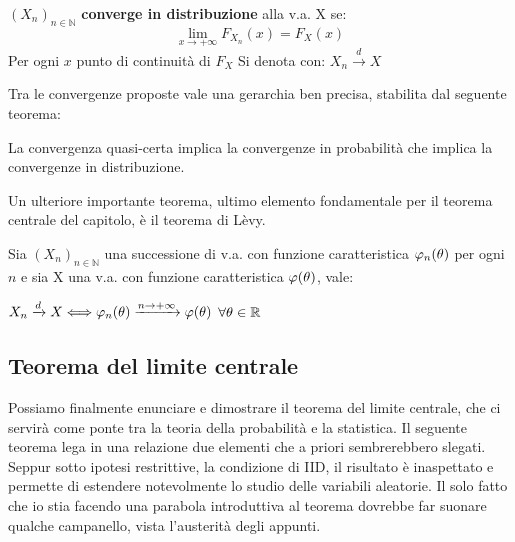 \vspace{5px}

\begin{definition}
$(X_n)_{n\in\mathbb{N}}$ \textbf{converge in distribuzione} alla v.a. X se:
\[\lim_{x \to +\infty} F_{X_n}(x) = F_X(x)\]
Per ogni $x$ punto di continuità di $F_X$ 
\newline
\noindent
Si denota con: $X_n\xrightarrow{d}X$
\end{definition}


Tra le convergenze proposte vale una gerarchia ben precisa, stabilita dal seguente teorema:

\vspace{5px}

\begin{theorem}
La convergenza quasi-certa implica la convergenze in probabilità che implica la convergenze in distribuzione.
\end{theorem}



Un ulteriore importante teorema, ultimo elemento fondamentale per il teorema centrale del capitolo, è il teorema di Lèvy.

\begin{theorem}[Lèvy]
Sia $(X_n)_{n\in\mathbb{N}}$ una successione di v.a. con funzione caratteristica $\varphi_n(\theta)$ per ogni $n$ e sia X una v.a. con funzione caratteristica $\varphi(\theta)$, vale:
\begin{center}
$X_n\xrightarrow{d}X \Longleftrightarrow \varphi_n(\theta)\xrightarrow{n\to+\infty}\varphi(\theta)$ \hspace{4px} $\forall\theta\in\mathbb{R}$
\end{center}
\end{theorem}

\vspace{15px}

\subsection{Teorema del limite centrale}

Possiamo finalmente enunciare e dimostrare il teorema del limite centrale, che ci servirà come ponte tra la teoria della probabilità e la statistica. Il seguente teorema lega in una relazione due elementi che a priori sembrerebbero slegati. Seppur sotto ipotesi restrittive, la condizione di IID, il risultato è inaspettato e permette di estendere notevolmente lo studio delle variabili aleatorie. Il solo fatto che io stia facendo una parabola introduttiva al teorema dovrebbe far suonare qualche campanello, vista l'austerità degli appunti.

